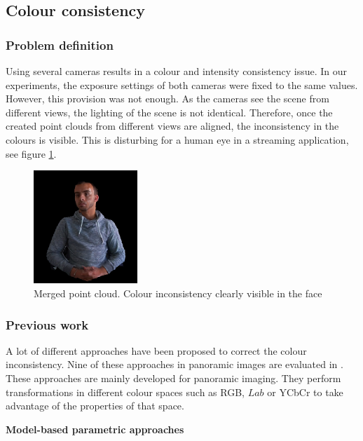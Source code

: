 \subsection{Colour consistency}

\subsubsection{Problem definition}
Using several cameras results in a colour and intensity consistency issue. In our experiments, the exposure settings of both cameras were fixed to the same values. However, this provision was not enough. As the cameras see the scene from different views, the lighting of the scene is not identical. Therefore, once the created point clouds from different views are aligned, the inconsistency in the colours is visible. This is disturbing for a human eye in a streaming application, see figure \ref{figure:raw_colour_2}.

\begin{figure}[H]
    \centering
    \includegraphics[width=0.35\textwidth]{images/visual_enhancement/colour/raw_colour.png}
    \caption{Merged point cloud. Colour inconsistency clearly visible in the face}
    \label{figure:raw_colour_2}
\end{figure}


\subsubsection{Previous work}

A lot of different approaches have been proposed to correct the colour inconsistency. Nine of these approaches in panoramic images are evaluated in \cite{xu_performance_2010} . These approaches are mainly developed for panoramic imaging. They perform transformations in different colour spaces such as RGB, $Lab$ or YCbCr to take advantage of the properties of that space.

\textbf{Model-based parametric approaches}


